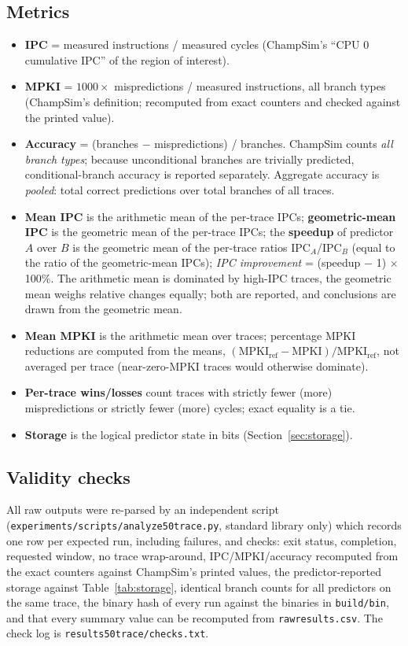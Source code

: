 \documentclass[11pt,a4paper]{article}
\newcommand{\code}[1]{\texttt{#1}}
\renewcommand{\_}{\textunderscore\allowbreak}
\begin{document}
\subsection{Metrics}\label{sec:metrics}
\begin{itemize}
\item \textbf{IPC} = measured instructions / measured cycles (ChampSim's ``CPU 0 cumulative IPC'' of the region of interest).
\item \textbf{MPKI} = $1000 \times$ mispredictions / measured instructions, all branch types (ChampSim's definition; recomputed from exact counters and checked against the printed value).
\item \textbf{Accuracy} = (branches $-$ mispredictions) / branches. ChampSim counts \emph{all branch types}; because unconditional branches are trivially predicted, conditional-branch accuracy is reported separately. Aggregate accuracy is \emph{pooled}: total correct predictions over total branches of all traces.
\item \textbf{Mean IPC} is the arithmetic mean of the per-trace IPCs; \textbf{geometric-mean IPC} is the geometric mean of the per-trace IPCs; the \textbf{speedup} of predictor $A$ over $B$ is the geometric mean of the per-trace ratios IPC$_A$/IPC$_B$ (equal to the ratio of the geometric-mean IPCs); \emph{IPC improvement} = (speedup $-$ 1) $\times$ 100\%. The arithmetic mean is dominated by high-IPC traces, the geometric mean weighs relative changes equally; both are reported, and conclusions are drawn from the geometric mean.
\item \textbf{Mean MPKI} is the arithmetic mean over traces; percentage MPKI reductions are computed from the means, $(\mathrm{MPKI}_{\mathrm{ref}} - \mathrm{MPKI})/\mathrm{MPKI}_{\mathrm{ref}}$, not averaged per trace (near-zero-MPKI traces would otherwise dominate).
\item \textbf{Per-trace wins/losses} count traces with strictly fewer (more) mispredictions or strictly fewer (more) cycles; exact equality is a tie.
\item \textbf{Storage} is the logical predictor state in bits (Section~\ref{sec:storage}).
\end{itemize}

\subsection{Validity checks}\label{sec:validity}
All raw outputs were re-parsed by an independent script (\code{experiments/scripts/analyze\_50trace.py}, standard library only) which records one row per expected run, including failures, and checks: exit status, completion, requested window, no trace wrap-around, IPC/MPKI/accuracy recomputed from the exact counters against ChampSim's printed values, the predictor-reported storage against Table~\ref{tab:storage}, identical branch counts for all predictors on the same trace, the binary hash of every run against the binaries in \code{build/bin}, and that every summary value can be recomputed from \code{raw\_results.csv}. The check log is \code{results\_50trace/checks.txt}. 
\end{document}
